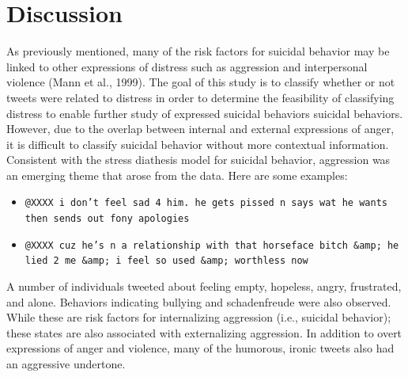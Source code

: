 \documentclass[11pt]{article}
\begin{document}
\section{Discussion}

As previously mentioned, many of the risk factors for suicidal behavior may be linked to other expressions of distress such as aggression and interpersonal violence (Mann et al., 1999).  The goal of this study is to classify whether or not tweets were related to distress in order to determine the feasibility of classifying distress to enable further study of expressed suicidal behaviors suicidal behaviors.  However, due to the overlap between internal and external expressions of anger, it is difficult to classify suicidal behavior without more contextual information.  Consistent with the stress diathesis model for suicidal behavior, aggression was an emerging theme that arose from the data.  Here are some examples:

\begin{itemize}
\footnotesize
\item \texttt{@XXXX i don't feel sad 4 him. he gets pissed n says wat he wants then sends out fony apologies}
\item \texttt{@XXXX cuz he's n a relationship with that horseface bitch \&amp; he lied 2 me \&amp; i feel so used \&amp; worthless now}
\end{itemize}

A number of individuals tweeted about feeling empty, hopeless, angry, frustrated, and alone.  Behaviors indicating bullying and schadenfreude were also observed. While these are risk factors for internalizing aggression (i.e., suicidal behavior); these states are also associated with externalizing aggression.  In addition to overt expressions of anger and violence, many of the humorous, ironic tweets also had an aggressive undertone. 

\end{document}
